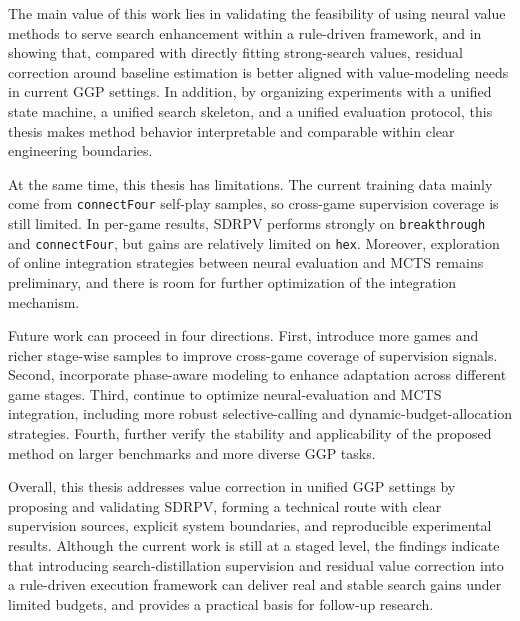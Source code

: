 The main value of this work lies in validating the feasibility of using neural value methods to serve search enhancement within a rule-driven framework, and in showing that, compared with directly fitting strong-search values, residual correction around baseline estimation is better aligned with value-modeling needs in current GGP settings. In addition, by organizing experiments with a unified state machine, a unified search skeleton, and a unified evaluation protocol, this thesis makes method behavior interpretable and comparable within clear engineering boundaries.

At the same time, this thesis has limitations. The current training data mainly come from \texttt{connectFour} self-play samples, so cross-game supervision coverage is still limited. In per-game results, SDRPV performs strongly on \texttt{breakthrough} and \texttt{connectFour}, but gains are relatively limited on \texttt{hex}. Moreover, exploration of online integration strategies between neural evaluation and MCTS remains preliminary, and there is room for further optimization of the integration mechanism.

Future work can proceed in four directions. First, introduce more games and richer stage-wise samples to improve cross-game coverage of supervision signals. Second, incorporate phase-aware modeling to enhance adaptation across different game stages. Third, continue to optimize neural-evaluation and MCTS integration, including more robust selective-calling and dynamic-budget-allocation strategies. Fourth, further verify the stability and applicability of the proposed method on larger benchmarks and more diverse GGP tasks.

Overall, this thesis addresses value correction in unified GGP settings by proposing and validating SDRPV, forming a technical route with clear supervision sources, explicit system boundaries, and reproducible experimental results. Although the current work is still at a staged level, the findings indicate that introducing search-distillation supervision and residual value correction into a rule-driven execution framework can deliver real and stable search gains under limited budgets, and provides a practical basis for follow-up research.
